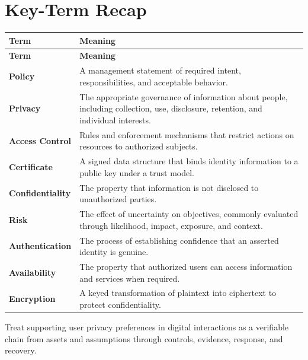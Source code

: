 \documentclass[11pt]{article}
\begin{document}
\section*{Key-Term Recap}
\begin{longtable}{>{\RaggedRight\arraybackslash}p{}>{\RaggedRight\arraybackslash}p{}}
\toprule\rowcolor{Navy}\color{white}\textbf{Term} & \color{white}\textbf{Meaning}\\\midrule
\endfirsthead
\toprule\rowcolor{Navy}\color{white}\textbf{Term} & \color{white}\textbf{Meaning}\\\midrule
\endhead
\textbf{Policy} & A management statement of required intent, responsibilities, and acceptable behavior. \\\midrule
\textbf{Privacy} & The appropriate governance of information about people, including collection, use, disclosure, retention, and individual interests. \\\midrule
\textbf{Access Control} & Rules and enforcement mechanisms that restrict actions on resources to authorized subjects. \\\midrule
\textbf{Certificate} & A signed data structure that binds identity information to a public key under a trust model. \\\midrule
\textbf{Confidentiality} & The property that information is not disclosed to unauthorized parties. \\\midrule
\textbf{Risk} & The effect of uncertainty on objectives, commonly evaluated through likelihood, impact, exposure, and context. \\\midrule
\textbf{Authentication} & The process of establishing confidence that an asserted identity is genuine. \\\midrule
\textbf{Availability} & The property that authorized users can access information and services when required. \\\midrule
\textbf{Encryption} & A keyed transformation of plaintext into ciphertext to protect confidentiality. \\\midrule
\bottomrule
\end{longtable}
\begin{takeawaybox}
Treat supporting user privacy preferences in digital interactions as a verifiable chain from assets and assumptions through controls, evidence, response, and recovery.
\end{takeawaybox}
\end{document}
